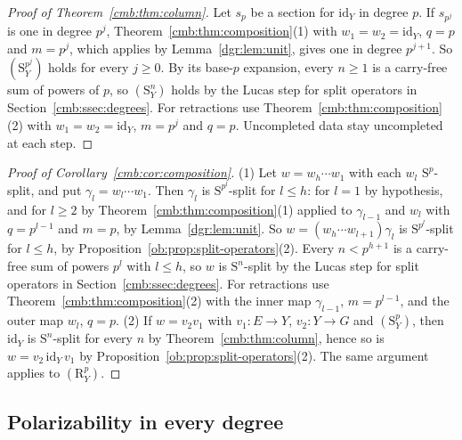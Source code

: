 \documentclass[11pt]{amsart}
\theoremstyle{definition}
\theoremstyle{remark}
\numberwithin{equation}{section}
\newcommand{\id}{\mathrm{id}}
\theoremstyle{plain}
\theoremstyle{definition}
\theoremstyle{plain}
\begin{document}
\begin{proof}[Proof of Theorem~\ref{cmb:thm:column}]
Let $s_p$ be a section for $\id_Y$ in degree $p$. If $s_{p^j}$ is one in degree $p^j$, Theorem~\ref{cmb:thm:composition}(1)
with $w_1=w_2=\id_Y$, $q=p$ and $m=p^j$, which applies by Lemma~\ref{dgr:lem:unit}, gives one in degree $p^{j+1}$. So
$(\mathrm S^{p^j}_Y)$ holds for every $j\ge0$. By its base-$p$ expansion, every $n\ge1$ is a carry-free sum of powers of
$p$, so $(\mathrm S^n_Y)$ holds by the Lucas step for split operators in Section~\ref{cmb:ssec:degrees}. For retractions
use Theorem~\ref{cmb:thm:composition}(2) with $w_1=w_2=\id_Y$, $m=p^j$ and $q=p$. Uncompleted data stay uncompleted at each
step.
\end{proof}

\begin{proof}[Proof of Corollary~\ref{cmb:cor:composition}]
(1) Let $w=w_h\cdots w_1$ with each $w_l$ $\mathrm S^p$-split, and put $\gamma_l=w_l\cdots w_1$. Then $\gamma_l$ is
$\mathrm S^{p^l}$-split for $l\le h$: for $l=1$ by hypothesis, and for $l\ge2$ by Theorem~\ref{cmb:thm:composition}(1)
applied to $\gamma_{l-1}$ and $w_l$ with $q=p^{l-1}$ and $m=p$, by Lemma~\ref{dgr:lem:unit}. So $w=(w_h\cdots w_{l+1})\gamma_l$ is
$\mathrm S^{p^l}$-split for $l\le h$, by Proposition~\ref{ob:prop:split-operators}(2). Every $n<p^{h+1}$ is a carry-free
sum of powers $p^l$ with $l\le h$, so $w$ is $\mathrm S^n$-split by the Lucas step for split operators in
Section~\ref{cmb:ssec:degrees}. For retractions use Theorem~\ref{cmb:thm:composition}(2) with the inner map
$\gamma_{l-1}$, $m=p^{l-1}$, and the outer map $w_l$, $q=p$.
(2) If $w=v_2v_1$ with $v_1\colon E\to Y$, $v_2\colon Y\to G$ and $(\mathrm S^p_Y)$, then $\id_Y$ is $\mathrm S^n$-split for
every $n$ by Theorem~\ref{cmb:thm:column}, hence so is $w=v_2\,\id_Y\,v_1$ by Proposition~\ref{ob:prop:split-operators}(2).
The same argument applies to $(\mathrm R^p_Y)$.
\end{proof}

\subsection{Polarizability in every degree}\label{dgr:ssec:polarizable}
\end{document}
